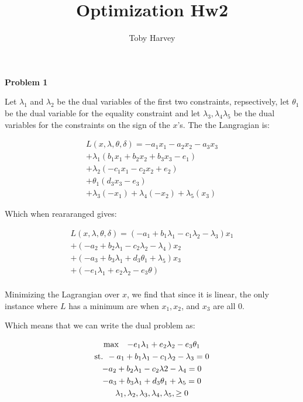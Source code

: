 \documentclass{article}
\begin{document}
\title{Optimization Hw2}
\author{Toby Harvey}
\maketitle
\noindent\textbf{Problem 1}


\vspace{5mm}

\noindent Let $\lambda_1$ and $\lambda_2$ be the dual variables of the first two constraints, repsectively, let $\theta_1$ be the dual variable for the equality constraint and let $\lambda_3, \lambda_4 \lambda_5$ be the dual variables for the constraints on the sign of the $x$'s. The the Langragian is:

\begin{gather*}
  L(x,\lambda,\theta,\delta) = -a_1x_1 -a_2x_2 -a_3x_3\\
  + \lambda_1(b_1x_1 + b_2x_2 + b_3x_3 - e_1) \\
  + \lambda_2(-c_1x_1 - c_2x_2 + e_2) \\ 
  + \theta_1(d_3 x_3 - e_3) \\
  + \lambda_3(-x_1) + \lambda_4(-x_2) + \lambda_5(x_3)
\end{gather*}

Which when reararanged gives:

\begin{gather*}
   L(x,\lambda,\theta,\delta) = (-a_1 + b_1\lambda_1 - c_1\lambda_2 - \lambda_3) x_1 \\
  + (-a_2 +b_2\lambda_1 - c_2\lambda_2 - \lambda_4) x_2 \\
  + (-a_3 + b_3\lambda_1 + d_3\theta_1 + \lambda_5) x_3 \\
  + (-e_1\lambda_1 + e_2\lambda_2 - e_3\theta) \\
\end{gather*}

Minimizing the Lagrangian over $x$, we find that since it is linear, the only instance where $L$ has a minimum are when $x_1, x_2$, and $x_3$ are all 0.

Which means that we can write the dual problem as:

\begin{gather*}
  \max \hspace{3mm} -e_1\lambda_1 + e_2\lambda_2 - e_3\theta_1\\
  \text{st.  } -a_1 + b_1\lambda_1 - c_1\lambda_2 - \lambda_3 = 0 \\
  -a_2 + b_2\lambda_1 - c_2\lambda2 - \lambda_4 = 0 \\
  -a_3 + b_3\lambda_1 + d_3\theta_1 + \lambda_5 = 0 \\
  \lambda_1, \lambda_2, \lambda_3, \lambda_4, \lambda_5, \geq 0 \\
\end{gather*}
 
\end{document}
